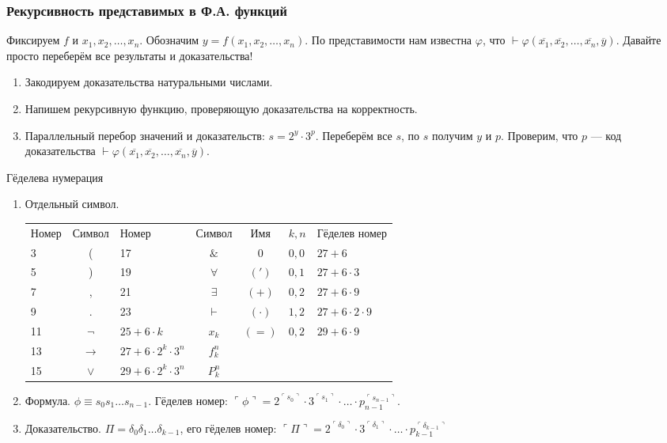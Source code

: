 \subsubsection{Рекурсивность представимых в Ф.А. функций}

Фиксируем $f$ и $x_1, x_2, \dots, x_n$. Обозначим $y = f(x_1,x_2,\dots,x_n)$.
По представимости нам известна $\varphi$, что $\vdash \varphi(\overline{x_1},\overline{x_2},\dots,\overline{x_n},\overline{y})$.
Давайте просто переберём все результаты и доказательства!

\begin{enumerate}
\item Закодируем доказательства натуральными числами.
\item Напишем рекурсивную функцию, проверяющую доказательства на корректность.
\item Параллельный перебор значений и доказательств: $s = 2^y \cdot 3^p$. Переберём все $s$, по $s$ получим $y$ и $p$.
Проверим, что $p$ --- код доказательства $\vdash \varphi(\overline{x_1},\overline{x_2},\dots,\overline{x_n},\overline{y})$.
\end{enumerate}


Гёделева нумерация
\begin{enumerate}
\item Отдельный символ.

\begin{tabular}{lc|lc||cll}
Номер & Символ & Номер & Символ & Имя & $k,n$ & Гёделев номер\\
3 & ( &               17 & $\&$ &  0 & $0,0$ & $27 + 6$\\
5 & ) &               19 & $\forall$ & $(')$ & $0,1$ & $27 + 6 \cdot 3$\\
7 & , &               21 & $\exists$ & $(+)$ & $0,2$ & $27 + 6 \cdot 9$\\
9 & . &               23 & $\vdash$ & $(\cdot)$ & $1,2$ & $27 + 6 \cdot 2 \cdot 9$\\
11 & $\neg$ &         $25 + 6\cdot k$ & $x_k$ & $(=)$ & $0,2$ & $29 + 6 \cdot 9$\\
13 & $\rightarrow$ &  $27 + 6\cdot 2^k \cdot 3^n$ & $f_k^n$\\
15 & $\vee$ &         $29 + 6\cdot 2^k \cdot 3^n$ & $P_k^n$
\end{tabular}

\item Формула. $\phi \equiv s_0s_1\dots s_{n-1}$. Гёделев номер: $\ulcorner\phi\urcorner = 2^{\ulcorner s_0\urcorner}\cdot 3^{\ulcorner s_1\urcorner}
\cdot \dots \cdot p_{n-1}^{\ulcorner s_{n-1}\urcorner}$.

\item Доказательство. $\Pi = \delta_0\delta_1\dots\delta_{k-1}$, его гёделев номер: $\ulcorner\Pi\urcorner =
2^{\ulcorner \delta_0\urcorner}\cdot 3^{\ulcorner \delta_1\urcorner} \cdot \dots \cdot p_{k-1}^{\ulcorner \delta_{k-1}\urcorner}$
\end{enumerate}


